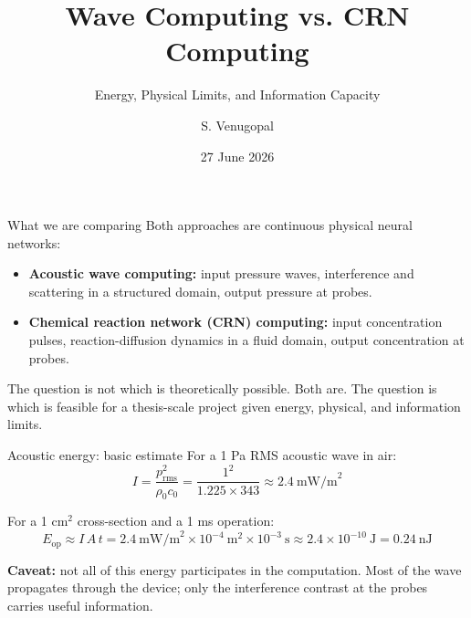 \documentclass[aspectratio=169,11pt]{beamer}
\title{Wave Computing vs. CRN Computing}
\subtitle{Energy, Physical Limits, and Information Capacity}
\author{S. Venugopal}
\institute{Cranfield University\hspace{0.3cm}|\hspace{0.3cm}Supervisors: Prof. Weisi Guo, Prof. Takis Tsoutsanis}
\date{27 June 2026}
\begin{document}
\begin{frame}[plain]
  \titlepage
\end{frame}

\begin{frame}{What we are comparing}
  \small
  Both approaches are continuous physical neural networks:
  \begin{itemize}
    \item \textbf{Acoustic wave computing:} input pressure waves, interference and scattering in a structured domain, output pressure at probes.
    \item \textbf{Chemical reaction network (CRN) computing:} input concentration pulses, reaction-diffusion dynamics in a fluid domain, output concentration at probes.
  \end{itemize}

  \vspace{0.3cm}
  The question is not which is theoretically possible. Both are. The question is which is feasible for a thesis-scale project given energy, physical, and information limits.
\end{frame}

\begin{frame}{Acoustic energy: basic estimate}
  \small
  For a 1 Pa RMS acoustic wave in air:
  \[
    I = \frac{p_{\text{rms}}^2}{\rho_0 c_0} = \frac{1^2}{1.225 \times 343} \approx 2.4\ \text{mW/m}^2
  \]

  For a 1 cm$^2$ cross-section and a 1 ms operation:
  \[
    E_{\text{op}} \approx I \, A \, t = 2.4\ \text{mW/m}^2 \times 10^{-4}\ \text{m}^2 \times 10^{-3}\ \text{s} \approx 2.4 \times 10^{-10}\ \text{J} = 0.24\ \text{nJ}
  \]

  \vspace{0.2cm}
  \textbf{Caveat:} not all of this energy participates in the computation. Most of the wave propagates through the device; only the interference contrast at the probes carries useful information.
\end{frame}
\end{document}
